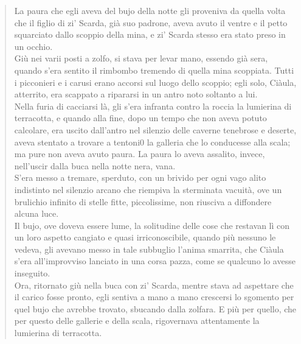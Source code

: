 \documentclass[a4paper, twoside, titlepage]{book}
\newcounter{mar}
\begin{document}
\begin{quotation}
La paura che egli aveva del bujo della notte gli proveniva da quella volta che il figlio di zi’ Scarda, già suo padrone, aveva avuto il ventre e il petto squarciato dallo scoppio della mina, e zi’ Scarda stesso era stato preso in un occhio.\\
Giù nei varii posti a zolfo, si stava per levar mano, essendo già sera, quando s’era sentito il rimbombo tremendo di quella mina scoppiata. Tutti i picconieri e i carusi erano accorsi sul luogo dello scoppio; egli solo, Ciàula, atterrito, era scappato a ripa­rarsi in un antro noto soltanto a lui.\\
Nella furia di cacciarsi là, gli s’era infranta contro la roccia la lumierina di terracotta, e quando alla fine, dopo un tempo che non aveva potuto calcolare, era uscito dall’antro nel silenzio delle caverne tenebrose e deserte, aveva stentato a trovare a tentoni0 la galleria che lo conducesse alla scala; ma pure non aveva avuto paura. La paura lo aveva assalito, invece, nell’uscir dalla buca nella notte nera, vana.\\
S’era messo a tremare, sperduto, con un brivido per ogni vago alito indistinto nel silenzio arcano che riempiva la sterminata vacuità, ove un brulichio infinito di stelle fitte, piccolissime, non riusciva a diffondere alcuna luce.\\
Il bujo, ove doveva essere lume, la solitudine delle cose che restavan lì con un loro aspetto cangiato e quasi irriconoscibile, quando più nessuno le vedeva, gli avevano messo in tale subbuglio l’anima smarrita, che Ciàula s’era all’improvviso lanciato in una corsa pazza, come se qualcuno lo avesse inseguito.\\
Ora, ritornato giù nella buca con zi’ Scarda, mentre stava ad aspettare che il carico fosse pronto, egli sentiva a mano a mano crescersi lo sgomento per quel bujo che avrebbe trovato, sbucando dalla zolfara. E più per quello, che per questo delle gallerie e della scala, rigovernava attentamente la lumierina di terracotta.\\


\end{quotation}
\end{document}
